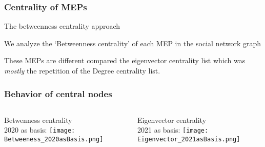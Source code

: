 \documentclass{beamer}
\begin{document}
\begin{frame}
	\frametitle{Centrality of MEPs}
	The betweenness centrality approach
	
	\pause We analyze the `Betweenness centrality' of each MEP in the social network graph
	
	\vspace{0.3cm}
	
	
	\vspace{0.3cm}
	
	\pause These MEPs are different compared the eigenvector centrality list which was \textit{mostly} the repetition of the Degree centrality list.
	
\end{frame}

\begin{frame}
\frametitle{Behavior of central nodes}
\begin{columns}
\column{5cm}
Betwenness centrality \\
2020 as basis:
\texttt{[image: Betweeness\_2020asBasis.png]}

\pause \column{5cm}
Eigenvector centrality \\
2021 as basis:
\texttt{[image: Eigenvector\_2021asBasis.png]}

\end{columns}
\end{frame}
\end{document}
